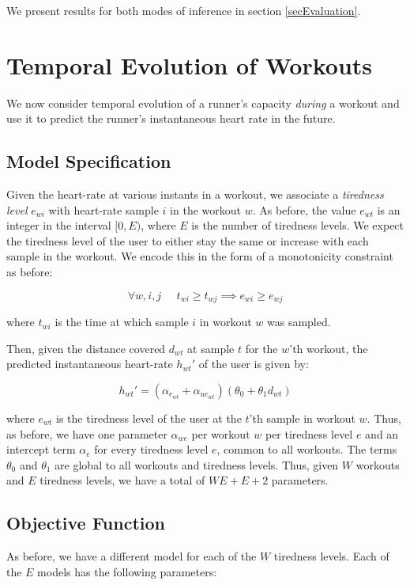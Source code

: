 \documentclass{acm_proc_article-sp}
\begin{document}
We present results for both modes of inference in section \ref{secEvaluation}.

\section{Temporal Evolution of Workouts}
\label{secTemporalModelWorkouts}
We now consider temporal evolution of a runner's capacity \emph{during} a workout and use it to predict the runner's instantaneous heart rate in the future. 

\subsection{Model Specification}

Given the heart-rate at various instants in a workout, we associate a \emph{tiredness level} $e_{wi}$ with heart-rate sample $i$ in the workout $w$. As before, the value $e_{wt}$ is an integer in the interval $[0, E)$, where $E$ is the number of tiredness levels. We expect the tiredness level of the user to either stay the same or increase with each sample in the workout. We encode this in the form of a monotonicity constraint as before:

$$\forall w,i,j \;\;\;\;\; t_{wi} \geq t_{wj} \implies e_{wi} \geq e_{wj}$$

where $t_{wi}$ is the time at which sample $i$ in workout $w$ was sampled.

Then, given the distance covered $d_{wt}$ at sample $t$ for the $w$'th workout, the predicted instantaneous heart-rate $h_{wt}'$ of the user is given by:

\begin{equation}
\label{eqnModelInstHr}
h_{wt}' = (\alpha_{e_{wt}} + \alpha_{ue_{wt}})(\theta_0 + \theta_1 d_{wt})
\end{equation}

where $e_{wt}$ is the tiredness level of the user at the $t$'th sample in workout $w$. Thus, as before, we have one parameter $\alpha_{we}$ per workout $w$ per tiredness level $e$ and an intercept term $\alpha_e$ for every tiredness level $e$, common to all workouts. The terms $\theta_0$ and $\theta_1$ are global to all workouts and tiredness levels. Thus, given $W$ workouts and $E$ tiredness levels, we have a total of $WE + E + 2$ parameters.

\subsection{Objective Function}
As before, we have a different model for each of the $W$ tiredness levels. Each of the $E$ models has the following parameters:
\end{document}
